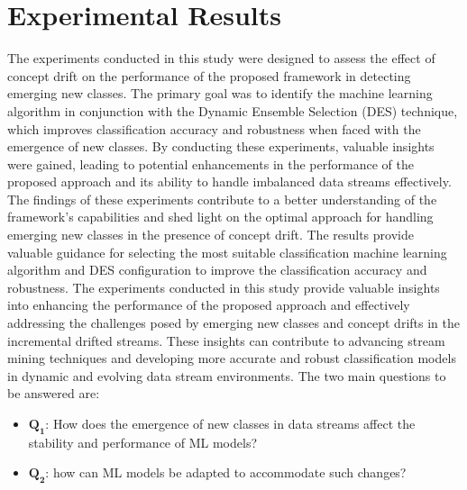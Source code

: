 \section{Experimental Results}
\label{sec:4_5_Expsetup}

The experiments conducted in this study were designed to assess the effect of concept drift on the performance of the proposed framework in detecting emerging new classes. The primary goal was to identify the machine learning algorithm in conjunction with the Dynamic Ensemble Selection (DES) technique, which improves classification accuracy and robustness when faced with the emergence of new classes. By conducting these experiments, valuable insights were gained, leading to potential enhancements in the performance of the proposed approach and its ability to handle imbalanced data streams effectively. The findings of these experiments contribute to a better understanding of the framework's capabilities and shed light on the optimal approach for handling emerging new classes in the presence of concept drift. The results provide valuable guidance for selecting the most suitable classification machine learning algorithm and DES configuration to improve the classification accuracy and robustness. The experiments conducted in this study provide valuable insights into enhancing the performance of the proposed approach and effectively addressing the challenges posed by emerging new classes and concept drifts in the incremental drifted streams. These insights can contribute to advancing stream mining techniques and developing more accurate and robust classification models in dynamic and evolving data stream environments. The two main questions to be answered are:

\begin{itemize}
  \setlength{\itemindent}{-.5in}
  
      \item $\pmb{Q_1}$: How does the emergence of new classes in data streams affect the stability and performance of ML models?
      \item  $\pmb{Q_2}$: how can ML models be adapted to accommodate such changes?
  \end{itemize}

